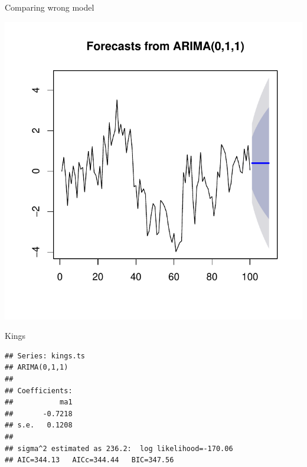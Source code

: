\begin{frame}[fragile]{Comparing wrong model}
  
\begin{knitrout}
\color{fgcolor}\begin{kframe}
\begin{alltt}
\hlstd{(}
\end{alltt}
\end{kframe}
\includegraphics[width=\maxwidth]{figure/reggina-1} 

\end{knitrout}
  
\end{frame}

\begin{frame}[fragile]{Kings}
  
\begin{knitrout}
\color{fgcolor}\begin{kframe}
\begin{alltt}
\hlkwb{=}
\end{alltt}
\begin{verbatim}
## Series: kings.ts 
## ARIMA(0,1,1)                    
## 
## Coefficients:
##           ma1
##       -0.7218
## s.e.   0.1208
## 
## sigma^2 estimated as 236.2:  log likelihood=-170.06
## AIC=344.13   AICc=344.44   BIC=347.56
\end{verbatim}
\end{kframe}
\end{knitrout}
  
\end{frame}

